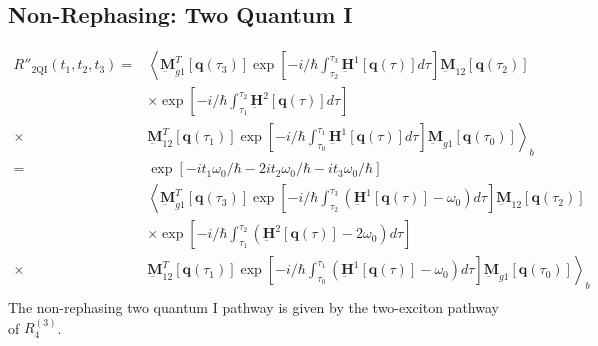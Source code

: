 \documentclass{article}
\newcommand{\bra}[1]{\ensuremath{\left\langle#1\right|}}
\newcommand{\ket}[1]{\ensuremath{\left|#1\right\rangle}}
\newcommand{\vect}[1]{\ensuremath{\boldsymbol{\mathbf{#1}}}}
\newcommand{\arw}{-{Latex[length=2mm]}}
\begin{document}
\subsection{Non-Rephasing: Two Quantum I}
\begin{figure}[h]
\centering
{}
\end{figure}
\begin{equation}
\begin{split}
 R''_\mathrm{2QI}(t_{1},t_{2},t_{3})=
  &\left\langle\underbar{\vect{M}}_{g1}^{T}[\vect q(\tau_{3})]\exp\left[-i/\hbar\int_{\tau_{2}}^{\tau_{3}}\underbar{\vect{H}}^{1}[\vect q(\tau)]d\tau\right] \underbar{\vect{M}}_{12} [\vect q(\tau_{2})]\right.\\
  &\times\exp\left[-i/\hbar\int_{\tau_{1}}^{\tau_{2}}\underbar{\vect{H}}^{2}[\vect q(\tau)]d\tau\right]\\
  \times&\left.\underbar{\vect{M}}_{12}^{T}[\vect q(\tau_{1})]\exp\left[-i/\hbar\int_{\tau_{0}}^{\tau_{1}}\underbar{\vect{H}}^{1}[\vect q(\tau)]d\tau\right] \underbar{\vect{M}}_{g1} [\vect q(\tau_{0})]\right\rangle_{b}\\
  =&\exp\left[-i t_{1}\omega_{0}/\hbar-2it_{2}\omega_{0}/\hbar-it_{3}\omega_{0}/\hbar\right]\\
  &\left\langle\underbar{\vect{M}}_{g1}^{T}[\vect q(\tau_{3})]\exp\left[-i/\hbar\int_{\tau_{2}}^{\tau_{3}}\left(\underbar{\vect{H}}^{1}[\vect q(\tau)]-\omega_{0}\right)d\tau\right] \underbar{\vect{M}}_{12} [\vect q(\tau_{2})]\right.\\
  &\times\exp\left[-i/\hbar\int_{\tau_{1}}^{\tau_{2}}\left(\underbar{\vect{H}}^{2}[\vect q(\tau)]-2\omega_{0}\right)d\tau\right]\\
  \times&\left.\underbar{\vect{M}}_{12}^{T}[\vect q(\tau_{1})]\exp\left[-i/\hbar\int_{\tau_{0}}^{\tau_{1}}\left(\underbar{\vect{H}}^{1}[\vect q(\tau)]-\omega_{0}\right)d\tau\right] \underbar{\vect{M}}_{g1} [\vect q(\tau_{0})]\right\rangle_{b}\\
\end{split}
\end{equation}
The non-rephasing two quantum I pathway is given by the two-exciton pathway of $R_{4}^{(3)}$.
\end{document}
